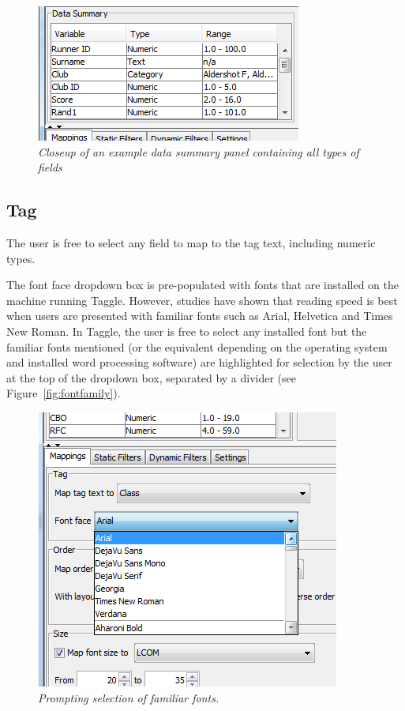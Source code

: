 \begin{figure} [h!]
  	\centering
   	\includegraphics[scale=0.80]{datasummary2.png}
  	\caption{\textit{Closeup of an example data summary panel containing all types of fields}}
	\label{fig:datasummary}
\end{figure}

\subsection{Tag}

The user is free to select any field to map to the tag text, including numeric types. 

The font face dropdown box is pre-populated with fonts that are installed on the machine running Taggle. However, studies have shown that reading speed is best when users are presented with familiar fonts such as Arial, Helvetica and Times New Roman\citep[pg 106, chap 11:7][]{usability06}. In Taggle, the user is free to select any installed font but the familiar fonts mentioned (or the equivalent depending on the operating system and installed word processing software) are highlighted for selection by the user at the top of the dropdown box, separated by a divider (see Figure~\vref{fig:fontfamily}).

\begin{figure} [h!]
  	\centering
   	\includegraphics[scale=0.50]{fontfamily.png}
  	\caption{\textit{Prompting selection of familiar fonts.}}
	\label{fig:fontfamily}
\end{figure}

